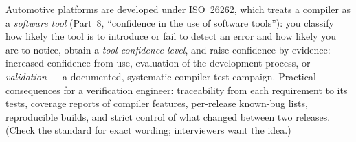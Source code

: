 \documentclass[10pt,a4paper,openany,oneside]{report}
\begin{document}
\begin{srcbox}
Automotive platforms are developed under ISO~26262, which treats a compiler as a \emph{software tool} (Part~8, ``confidence in the use of software tools''): you classify how likely the tool is to introduce or fail to detect an error and how likely you are to notice, obtain a \emph{tool confidence level}, and raise confidence by evidence: increased confidence from use, evaluation of the development process, or \emph{validation} --- a documented, systematic compiler test campaign. Practical consequences for a verification engineer: traceability from each requirement to its tests, coverage reports of compiler features, per-release known-bug lists, reproducible builds, and strict control of what changed between two releases. (Check the standard for exact wording; interviewers want the idea.)
\end{srcbox}
\end{document}
